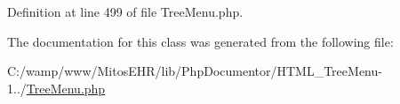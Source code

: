 \-Definition at line 499 of file \-Tree\-Menu.\-php.



\-The documentation for this class was generated from the following file\-:\begin{DoxyCompactItemize}
\item 
\-C\-:/wamp/www/\-Mitos\-E\-H\-R/lib/\-Php\-Documentor/\-H\-T\-M\-L\-\_\-\-Tree\-Menu-\/1../\hyperlink{_tree_menu_8php}{\-Tree\-Menu.\-php}\end{DoxyCompactItemize}
